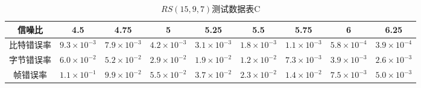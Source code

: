 \begin{table}[htpb]
    \caption{$RS(15,9,7)$测试数据表C}
  \label{tab:5.7}
  \centering
  \wuhao
  \begin{tabular}{|c||c|c|c|c|c|c|c|c|}
    \hline
    信噪比&4.5&4.75&5&5.25&5.5&5.75&6&6.25\\
    \hline
    \hline
    比特错误率&$9.3\times 10^{-3}$&$7.9\times 10^{-3}$&$4.2\times
    10^{-3}$&$3.1\times 10^{-3}$&$1.8\times 10^{-3}$&$1.1\times
    10^{-3}$&$5.8\times 10^{-4}$&$3.9\times 10^{-4}$\\
    字节错误率&$6.0\times 10^{-2}$&$5.2\times 10^{-2}$&$2.9\times
    10^{-2}$&$1.9\times 10^{-2}$&$1.2\times 10^{-2}$&$7.3\times
    10^{-3}$&$3.9\times 10^{-3}$&$2.6\times 10^{-3}$\\
    帧错误率&$1.1\times 10^{-1}$&$9.9\times 10^{-2}$&$5.5\times
    10^{-2}$&$3.7\times 10^{-2}$&$2.3\times 10^{-2}$&$1.4\times
    10^{-2}$&$7.5\times 10^{-3}$&$5.0\times 10^{-3}$\\
    \hline
  \end{tabular}

\end{table}


